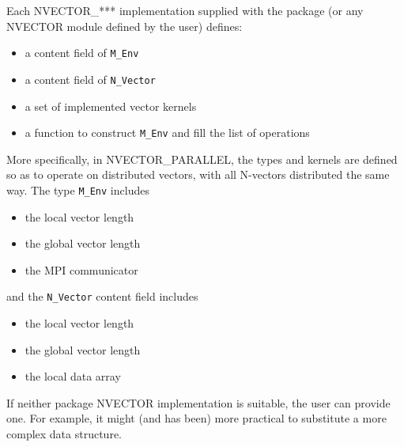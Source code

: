 Each NVECTOR\_*** implementation supplied with the package (or any
NVECTOR module defined by the user) defines:
\vspace*{-.19in}
\begin{itemize}
\item a content field of {\tt M\_Env}
\item a content field of {\tt N\_Vector}
\item a set of implemented vector kernels
\item a function to construct {\tt M\_Env} and fill the list of operations
\end{itemize}

More specifically, in NVECTOR\_PARALLEL, the types and kernels are
defined so as to operate on distributed vectors, with all N-vectors
distributed the same way.  The type {\tt M\_Env} includes
\vspace*{-.19in}
\begin{itemize}
  \item the local vector length
  \item the global vector length
  \item the MPI communicator
\end{itemize}
and the {\tt N\_Vector} content field includes
\vspace*{-.19in}
\begin{itemize}
  \item the local vector length
  \item the global vector length
  \item the local data array
\end{itemize}

If neither package NVECTOR implementation is suitable, the user can
provide one.  For example, it might (and has been) more practical to
substitute a more complex data structure.


